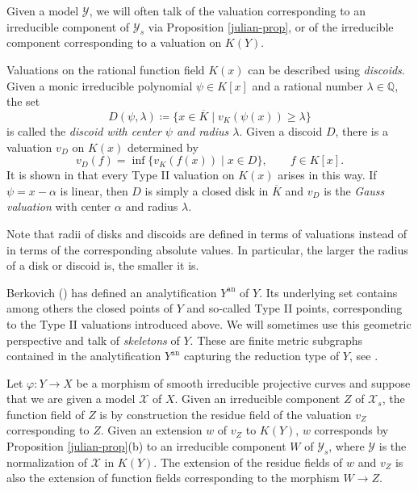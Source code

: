 \documentclass[11pt]{amsart}
\let\ge\geqslant
\renewcommand{\phi}{\varphi}
\newcommand{\BQ}{{\mathbb{Q}}}
\newcommand{\CX}{{\mathcal X}}
\newcommand{\CY}{{\mathcal Y}}
\theoremstyle{definition}
\begin{document}
Given a model $\CY$, we will often talk of the valuation corresponding to an irreducible component of $\CY_s$ via Proposition \ref{julian-prop}, or of the irreducible component corresponding to a valuation on $K(Y)$.

Valuations on the rational function field $K(x)$ can be described using \emph{discoids}. Given a monic irreducible polynomial $\psi\in K[x]$ and a rational number $\lambda\in\BQ$, the set 
\begin{equation*}
D(\psi,\lambda)\coloneqq\{x\in\overline{K}\mid v_K(\psi(x))\ge\lambda\}
\end{equation*}
is called the \emph{discoid with center $\psi$ and radius $\lambda$}. Given a discoid $D$, there is a valuation $v_D$ on $K(x)$ determined by 
\begin{equation*}
v_D(f)=\inf\{v_K(f(x))\mid x\in D\},\qquad f\in K[x].
\end{equation*}
It is shown in \cite[Theorem 4.56]{rueth} that every Type II valuation on $K(x)$ arises in this way. If $\psi=x-\alpha$ is linear, then $D$ is simply a closed disk in $\overline{K}$ and $v_D$ is the \emph{Gauss valuation} with center $\alpha$ and radius $\lambda$.

Note that radii of disks and discoids are defined in terms of valuations instead of in terms of the corresponding absolute values. In particular, the larger the radius of a disk or discoid is, the smaller it is.

Berkovich (\cite{berkovich}) has defined an analytification $Y^\textrm{an}$ of $Y$. Its underlying set contains among others the closed points of $Y$ and so-called Type II points, corresponding to the Type II valuations introduced above. We will sometimes use this geometric perspective and talk of \emph{skeletons} of $Y$. These are finite metric subgraphs contained in the analytification $Y^\textrm{an}$ capturing the reduction type of $Y$, see \cite[Chapter 4]{berkovich}.


Let $\phi\colon Y\to X$ be a morphism of smooth irreducible projective curves and suppose that we are given a model $\CX$ of $X$. Given an irreducible component $Z$ of $\CX_s$, the function field of $Z$ is by construction the residue field of the valuation $v_Z$ corresponding to $Z$. Given an extension $w$ of $v_Z$ to $K(Y)$, $w$ corresponds by Proposition \ref{julian-prop}(b) to an irreducible component $W$ of $\CY_s$, where $\CY$ is the normalization of $\CX$ in $K(Y)$. The extension of the residue fields of $w$ and $v_Z$ is also the extension of function fields corresponding to the morphism $W\to Z$.
\end{document}

